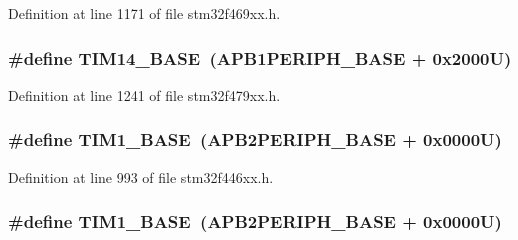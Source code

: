 Definition at line 1171 of file stm32f469xx.\+h.

\subsubsection[{\texorpdfstring{T\+I\+M14\+\_\+\+B\+A\+SE}{TIM14_BASE}}]{\setlength{\rightskip}{0pt plus 5cm}\#define T\+I\+M14\+\_\+\+B\+A\+SE~({\bf A\+P\+B1\+P\+E\+R\+I\+P\+H\+\_\+\+B\+A\+SE} + 0x2000\+U)}\hypertarget{group___peripheral__memory__map_ga862855347d6e1d92730dfe17ee8e90b8}{}\label{group___peripheral__memory__map_ga862855347d6e1d92730dfe17ee8e90b8}


Definition at line 1241 of file stm32f479xx.\+h.

\subsubsection[{\texorpdfstring{T\+I\+M1\+\_\+\+B\+A\+SE}{TIM1_BASE}}]{\setlength{\rightskip}{0pt plus 5cm}\#define T\+I\+M1\+\_\+\+B\+A\+SE~({\bf A\+P\+B2\+P\+E\+R\+I\+P\+H\+\_\+\+B\+A\+SE} + 0x0000\+U)}\hypertarget{group___peripheral__memory__map_gaf8aa324ca5011b8173ab16585ed7324a}{}\label{group___peripheral__memory__map_gaf8aa324ca5011b8173ab16585ed7324a}


Definition at line 993 of file stm32f446xx.\+h.

\subsubsection[{\texorpdfstring{T\+I\+M1\+\_\+\+B\+A\+SE}{TIM1_BASE}}]{\setlength{\rightskip}{0pt plus 5cm}\#define T\+I\+M1\+\_\+\+B\+A\+SE~({\bf A\+P\+B2\+P\+E\+R\+I\+P\+H\+\_\+\+B\+A\+SE} + 0x0000\+U)}\hypertarget{group___peripheral__memory__map_gaf8aa324ca5011b8173ab16585ed7324a}{}\label{group___peripheral__memory__map_gaf8aa324ca5011b8173ab16585ed7324a}


